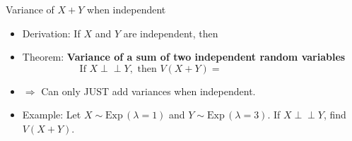 \documentclass{article}
\newcommand{\ind}{\perp \!\!\! \perp}			%
\newcommand{\follow}[1]{\sim \text{#1}\,}		%
\begin{document}
Variance of $X + Y$ when independent\bigskip
\begin{itemize}
    \item Derivation: If $X$ and $Y$ are independent, then\vspace{50pt}
    \item Theorem: \textbf{Variance of a sum of two independent random variables}
    \[\text{If } X \ind Y, \text{ then } V(X + Y) = \hspace{100pt}\]
    \item[] $\Longrightarrow$ Can only JUST add variances when independent.
    \item Example: Let $X \follow{Exp}(\lambda = 1)$ and $Y \follow{Exp}(\lambda = 3)$. If $X \ind Y$, find $V(X + Y)$.\vspace{30pt}
\end{itemize}\bigskip
\end{document}
